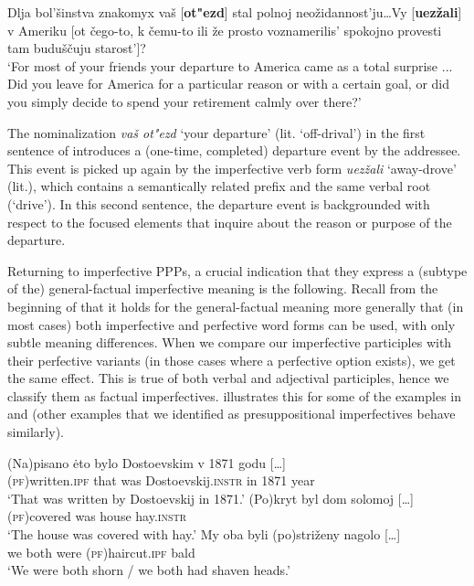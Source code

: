 \documentclass[output=paper,modfonts,newtxmath,hidelinks
]{langscibook}
\begin{document}
\ea Dlja bol'šinstva znakomyx vaš [\textbf{ot"ezd}] stal polnoj  neožidannost'ju\dots Vy [\textbf{uezžali}] v Ameriku [ot čego-to, k čemu-to ili že
	prosto voznamerilis' spokojno provesti tam buduščuju starost']?\\
`For most of your friends your departure to America came as a total surprise ... Did you leave for America for a particular reason or with a certain goal, or did you simply decide to spend your retirement calmly over there?'\label{departure}\hfill \citep[][207f.]{gronndiss}
\z

\noindent The nominalization \textit{vaš ot"ezd} `your departure' (lit. `off-drival') in the first sentence of  introduces a (one-time, completed) departure event by the addressee. This event is picked up again by the imperfective verb form \textit{uezžali} `away-drove' (lit.), which contains a semantically related prefix and the same verbal root (`drive'). In this second sentence, the departure event is backgrounded with respect to the focused elements that inquire about the reason or purpose of the departure. 

Returning to imperfective PPPs, a crucial indication that they express a (subtype of the) general-factual imperfective meaning is the following. Recall from the beginning of  that it holds for the general-factual meaning more generally that (in most cases) both imperfective and perfective word forms can be used, with only subtle meaning differences. When we compare our imperfective participles with their perfective variants (in those cases where a perfective option exists), we get the same effect. This is true of both verbal and adjectival participles, hence we classify them as factual imperfectives.  illustrates this for some of the examples in  and  (other examples that we identified as presuppositional imperfectives behave similarly). 

\ea\label{pisanoPF}
\ea\gll	(Na)pisano \.{e}to bylo Dostoevskim v 1871 godu [\dots]\\ 
	(\textsc{pf})written.\textsc{ipf} that was Dostoevskij.\textsc{instr} in 1871 year \\
\glt	`That was written by Dostoevskij in 1871.'
\ex\gll	(Po)kryt byl dom solomoj [\dots]\\ 		
	\textsc{(pf)}covered was house hay.\textsc{instr} 	\\
\glt	`The house was covered with hay.'
\ex\gll	My oba byli (po)striženy nagolo [\dots]\\
	we both were (\textsc{pf})haircut.\textsc{ipf} bald\\
\glt	`We were both shorn / we both had shaven heads.'
\z\z
\end{document}

